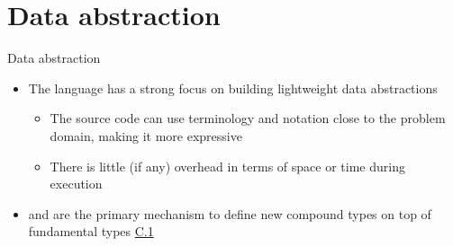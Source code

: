 

\section*{Data abstraction}

\begin{frame}[fragile]{Data abstraction}
  \begin{itemize}[<+->]
  \item The \Cpp{} language has a strong focus on building lightweight data
    abstractions
    \begin{itemize}
    \item The source code can use terminology and notation close to the problem
      domain, making it more expressive
    \item There is little (if any) overhead in terms of space or time during
      execution
    \end{itemize}
  \item {} and  are the primary mechanism to define new
    compound types on top of fundamental types
    \href{https://isocpp.github.io/CppCoreGuidelines/CppCoreGuidelines#c1-organize-related-data-into-structures-structs-or-classes}{C.1}
  \end{itemize}
\end{frame}

